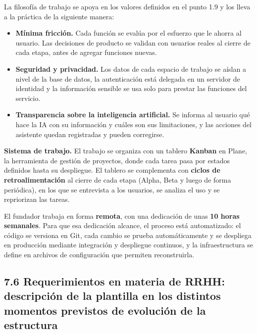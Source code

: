 La filosofía de trabajo se apoya en los valores definidos en el punto
1.9 y los lleva a la práctica de la siguiente manera:

\begin{itemize}
\tightlist
\item
  \textbf{Mínima fricción.} Cada función se evalúa por el esfuerzo que
  le ahorra al usuario. Las decisiones de producto se validan con
  usuarios reales al cierre de cada etapa, antes de agregar funciones
  nuevas.
\item
  \textbf{Seguridad y privacidad.} Los datos de cada espacio de trabajo
  se aíslan a nivel de la base de datos, la autenticación está delegada
  en un servidor de identidad y la información sensible se usa solo para
  prestar las funciones del servicio.
\item
  \textbf{Transparencia sobre la inteligencia artificial.} Se informa al
  usuario qué hace la IA con su información y cuáles son sus
  limitaciones, y las acciones del asistente quedan registradas y pueden
  corregirse.
\end{itemize}

\textbf{Sistema de trabajo.} El trabajo se organiza con un tablero
\textbf{Kanban} en Plane, la herramienta de gestión de proyectos, donde
cada tarea pasa por estados definidos hasta su despliegue. El tablero se
complementa con \textbf{ciclos de retroalimentación} al cierre de cada
etapa (Alpha, Beta y luego de forma periódica), en los que se entrevista
a los usuarios, se analiza el uso y se repriorizan las tareas.

El fundador trabaja en forma \textbf{remota}, con una dedicación de unas
\textbf{10 horas semanales}. Para que esa dedicación alcance, el proceso
está automatizado: el código se versiona en Git, cada cambio se prueba
automáticamente y se despliega en producción mediante integración y
despliegue continuos, y la infraestructura se define en archivos de
configuración que permiten reconstruirla.

\subsection*{7.6 Requerimientos en materia de RRHH: descripción de la
plantilla en los distintos momentos previstos de evolución de la
estructura}\label{requerimientos-en-materia-de-rrhh-descripciuxf3n-de-la-plantilla-en-los-distintos-momentos-previstos-de-evoluciuxf3n-de-la-estructura}

